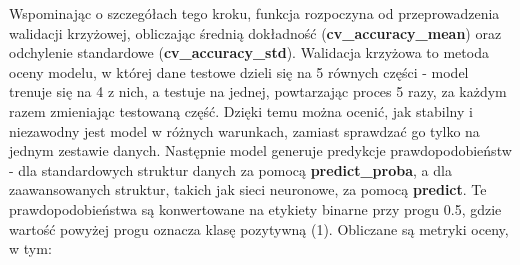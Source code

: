 Wspominając o szczegółach tego kroku, funkcja rozpoczyna od przeprowadzenia walidacji krzyżowej, obliczając średnią dokładność (\textbf{cv\_accuracy\_mean}) oraz odchylenie standardowe (\textbf{cv\_accuracy\_std}). Walidacja krzyżowa to metoda oceny modelu, w której dane testowe dzieli się na 5 równych części - model trenuje się na 4 z nich, a testuje na jednej, powtarzając proces 5 razy, za każdym razem zmieniając testowaną część. Dzięki temu można ocenić, jak stabilny i niezawodny jest model w różnych warunkach, zamiast sprawdzać go tylko na jednym zestawie danych. Następnie model generuje predykcje prawdopodobieństw - dla standardowych struktur danych za pomocą \textbf{predict\_proba}, a dla zaawansowanych struktur, takich jak sieci neuronowe, za pomocą \textbf{predict}. Te prawdopodobieństwa są konwertowane na etykiety binarne przy progu 0.5, gdzie wartość powyżej progu oznacza klasę pozytywną (1). Obliczane są metryki oceny, w tym:

